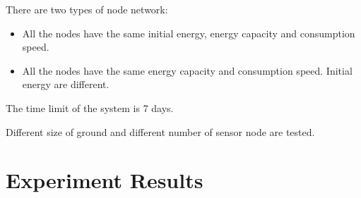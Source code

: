 \documentclass[11pt]{article}
\begin{document}
There are two types of node network:
\begin{itemize}
\item All the nodes have the same initial energy, energy capacity and consumption speed.
\item All the nodes have the same energy capacity and consumption speed. Initial energy are different.
\end{itemize}

The time limit of the system is 7 days.

Different size of ground and different number of sensor node are tested.
\section{Experiment Results}
\end{document}
